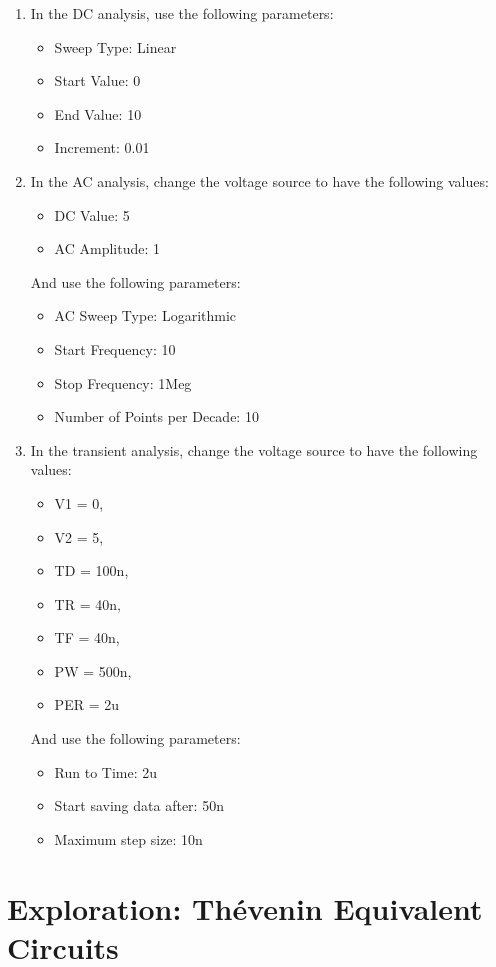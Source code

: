 \documentclass[12pt]{../manual}
\begin{document}
\begin{enumerate}
\item In the DC analysis, use the following parameters:
\begin{itemize}
\item Sweep Type: Linear
\item Start Value: 0
\item End Value: 10
\item Increment: 0.01
\end{itemize}
\item In the AC analysis, change the voltage source to have the following values:
\begin{itemize}
\item DC Value: 5
\item AC Amplitude: 1
\end{itemize}
And use the following parameters:
\begin{itemize}
\item AC Sweep Type: Logarithmic 
\item Start Frequency: 10
\item Stop Frequency: 1Meg
\item Number of Points per Decade: 10
\end{itemize}
\newpage
\item In the transient analysis, change the voltage source to have the following values:
\begin{itemize}
\item V1 = 0, 
\item V2 = 5, 
\item TD = 100n, 
\item TR = 40n, 
\item TF = 40n, 
\item PW = 500n, 
\item PER = 2u
\end{itemize}
And use the following parameters:
\begin{itemize}
\item Run to Time: 2u
\item Start saving data after: 50n
\item Maximum step size: 10n
\end{itemize}
\end{enumerate}
%
\newpage
\section{Exploration: Th\'evenin Equivalent Circuits}
\end{document}
